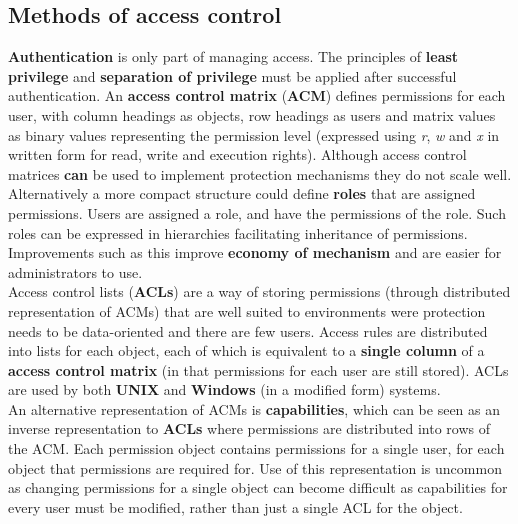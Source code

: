 \documentclass{article}
\newcommand{\np}{\vspace{8pt} \\}
\begin{document}
\subsection{Methods of access control}
\textbf{Authentication} is only part of managing access. The principles of \textbf{least privilege} and \textbf{separation of privilege} must be applied after successful authentication. An \textbf{access control matrix} (\textbf{ACM}) defines permissions for each user, with column headings as objects, row headings as users and matrix values as binary values representing the permission level (expressed using \textit{r}, \textit{w} and \textit{x} in written form for read, write and execution rights). Although access control matrices \textbf{can} be used to implement protection mechanisms they do not scale well. \np
Alternatively a more compact structure could define \textbf{roles} that are assigned permissions. Users are assigned  a role, and have the permissions of the role. Such roles can be expressed in hierarchies facilitating inheritance of permissions. Improvements such as this improve \textbf{economy of mechanism} and are easier for administrators to use. \np
Access control lists (\textbf{ACLs}) are a way of storing permissions (through distributed representation of ACMs) that are well suited to environments were protection needs to be data-oriented and there are few users. Access rules are distributed into lists for each object, each of which is equivalent to a \textbf{single column} of a \textbf{access control matrix} (in that permissions for each user are still stored). ACLs are used by both \textbf{UNIX} and \textbf{Windows} (in a modified form) systems. \np
An alternative representation of ACMs is \textbf{capabilities}, which can be seen as an inverse representation to \textbf{ACLs} where permissions are distributed into rows of the ACM. Each permission object contains permissions for a single user, for each object that permissions are required for. Use of this representation is uncommon as changing permissions for a single object can become difficult as capabilities for every user must be modified, rather than just a single ACL for the object.
\end{document}

